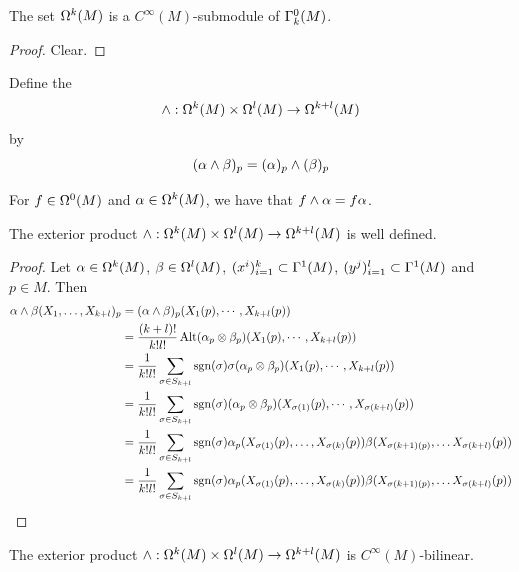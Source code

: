 \documentclass{book}
\begin{document}
	\begin{ex}
	The set $\Omega^k(M)$ is a $C^{\infty}(M)$-submodule of $\Gamma^0_k(M)$.
	\end{ex}
	
	\begin{proof}
	Clear.
	\end{proof}

	

	\begin{defn}
		Define the  $$\wedge: \Omega^k(M) \times \Omega^l(M) \rightarrow \Omega^{k+l}(M) $$ by $$(\alpha \wedge \beta)_p = (\alpha)_p \wedge (\beta)_p$$
	\end{defn}
	
	\begin{note}
		For $f \in \Omega^0(M)$ and $\alpha \in \Omega^k(M)$, we have that $f \wedge \alpha = f \alpha$.
	\end{note}
	
	\begin{ex}
	The exterior product $\wedge: \Omega^k(M) \times \Omega^l(M) \rightarrow \Omega^{k+l}(M) $ is well defined.
	\end{ex}
	
	\begin{proof}
	Let $\alpha \in \Omega^k(M)$, $\beta \in \Omega^l(M)$, $(x^i)_{i=1}^k \subset \Gamma^1(M)$, $(y^j)_{i=1}^l \subset \Gamma^1(M)$ and $p \in M$. Then 
	\begin{align*}
	\alpha \wedge \beta (X_1, \dots, X_{k+l})_p
	& = (\alpha \wedge \beta)_p ({X_1}(p), \cdots, {X_{k+l}}(p)) \\
	& = \frac{(k+l)!}{k! l!} \operatorname{Alt}(\alpha_p \otimes \beta_p)({X_1}(p), \cdots, {X_{k+l}}(p)) \\
	& = \frac{1}{k! l!} \sum_{\sigma \in S_{k+l}} \operatorname{sgn}(\sigma)\sigma (\alpha_p \otimes \beta_p) ({X_1}(p), \cdots, {X_{k+l}}(p)) \\
	& = \frac{1}{k! l!} \sum_{\sigma \in S_{k+l}} \operatorname{sgn}(\sigma)(\alpha_p \otimes \beta_p) (X_{\sigma(1)}(p), \cdots, X_{\sigma(k+l)}(p)) \\
	& = \frac{1}{k! l!} \sum_{\sigma \in S_{k+l}} \operatorname{sgn}(\sigma) \alpha_p(X_{\sigma(1)}(p), \dots,X_{\sigma(k)}(p)) \beta(X_{\sigma(k+1)(p)}, \dots X_{\sigma(k+l)}(p)) \\
	& = \frac{1}{k! l!} \sum_{\sigma \in S_{k+l}} \operatorname{sgn}(\sigma) \alpha_p(X_{\sigma(1)}(p), \dots,X_{\sigma(k)}(p)) \beta(X_{\sigma(k+1)(p)}, \dots X_{\sigma(k+l)}(p)) \\
	\end{align*}	 
	\end{proof}
	
	\begin{ex}
	The exterior product $\wedge: \Omega^k(M) \times \Omega^l(M) \rightarrow \Omega^{k+l}(M) $ is $C^{\infty}(M)$-bilinear.
	\end{ex}
	
\end{document}
